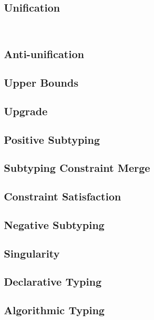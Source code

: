 \documentclass[a4,natbib=false]{article}
\begin{document}
\subsection{Unification}
\

\subsection{Anti-unification}


\subsection{Upper Bounds}


\subsection{Upgrade}


\subsection{Positive Subtyping}


\subsection{Subtyping Constraint Merge}


\subsection{Constraint Satisfaction}


\subsection{Negative Subtyping}


\subsection{Singularity}


\subsection{Declarative Typing}


\subsection{Algorithmic Typing}

\end{document}
